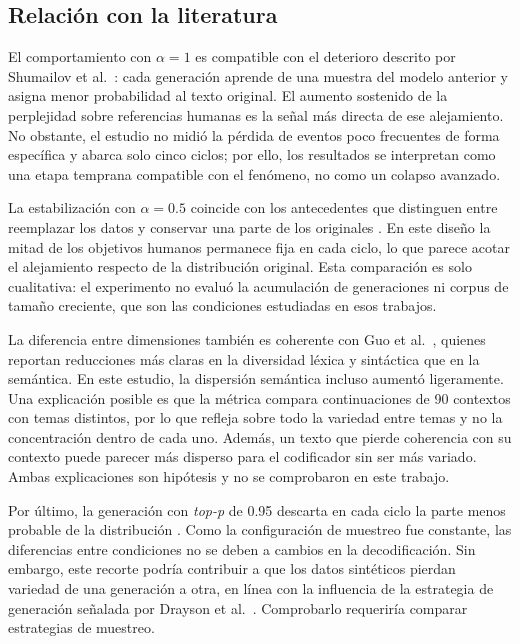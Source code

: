 \documentclass[12pt,letterpaper]{article}
\begin{document}
\subsection{Relación con la literatura}

El comportamiento con \(\alpha=1\) es compatible con el deterioro descrito
por Shumailov et al.\ \cite{shumailov2024}: cada generación aprende de una
muestra del modelo anterior y asigna menor probabilidad al texto original.
El aumento sostenido de la perplejidad sobre referencias humanas es la
señal más directa de ese alejamiento. No obstante, el estudio no midió la
pérdida de eventos poco frecuentes de forma específica y abarca solo cinco
ciclos; por ello, los resultados se interpretan como una etapa temprana
compatible con el fenómeno, no como un colapso avanzado.

La estabilización con \(\alpha=0.5\) coincide con los antecedentes que
distinguen entre reemplazar los datos y conservar una parte de los
originales \cite{gerstgrasser2024,kazdan2025}. En este diseño la mitad de
los objetivos humanos permanece fija en cada ciclo, lo que parece acotar
el alejamiento respecto de la distribución original. Esta comparación es
solo cualitativa: el experimento no evaluó la acumulación de generaciones
ni corpus de tamaño creciente, que son las condiciones estudiadas en esos
trabajos.

La diferencia entre dimensiones también es coherente con Guo et al.\
\cite{guo2024}, quienes reportan reducciones más claras en la diversidad
léxica y sintáctica que en la semántica. En este estudio, la dispersión
semántica incluso aumentó ligeramente. Una explicación posible es que la
métrica compara continuaciones de 90 contextos con temas distintos, por lo
que refleja sobre todo la variedad entre temas y no la concentración dentro
de cada uno. Además, un texto que pierde coherencia con su contexto puede
parecer más disperso para el codificador sin ser más variado. Ambas
explicaciones son hipótesis y no se comprobaron en este trabajo.

Por último, la generación con \textit{top-p} de 0.95 descarta en cada ciclo
la parte menos probable de la distribución \cite{holtzman2020}. Como la
configuración de muestreo fue constante, las diferencias entre condiciones
no se deben a cambios en la decodificación. Sin embargo, este recorte
podría contribuir a que los datos sintéticos pierdan variedad de una
generación a otra, en línea con la influencia de la estrategia de
generación señalada por Drayson et al.\ \cite{drayson2025}. Comprobarlo
requeriría comparar estrategias de muestreo.
\end{document}
